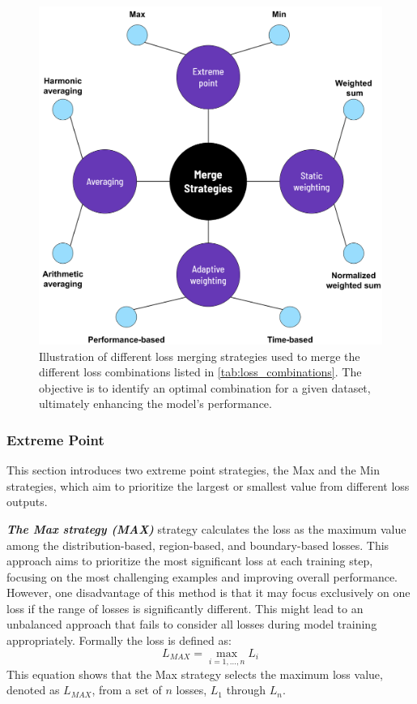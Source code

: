 \begin{figure}[H]%
  \centering
  \includegraphics[width=\imgWidthL]{images/MergeStrategies.png}
  \caption[Merging strategies]{Illustration of different loss merging strategies used to merge the different loss combinations listed in \ref{tab:loss_combinations}. The objective is to identify an optimal combination for a given dataset, ultimately enhancing the model's performance.}
  \label{merging_strategies}
\end{figure}

\subsubsection*{Extreme Point}
This section introduces two extreme point strategies, the Max and the Min strategies, which aim to prioritize the largest or smallest value from different loss outputs.

\textbf{\emph{The Max strategy (MAX)}} strategy calculates the loss as the maximum value among the distribution-based, region-based, and boundary-based losses. This approach aims to prioritize the most significant loss at each training step, focusing on the most challenging examples and improving overall performance. However, one disadvantage of this method is that it may focus exclusively on one loss if the range of losses is significantly different. This might lead to an unbalanced approach that fails to consider all losses during model training appropriately. Formally the loss is defined as:
\begin{equation}
  L_{MAX} = \max_{i=1,\dots,n} L_i
  \label{eqn:max_strategy}
\end{equation}
This equation shows that the Max strategy selects the maximum loss value, denoted as $L_{MAX}$, from a set of $n$ losses, $L_1$ through $L_n$.

